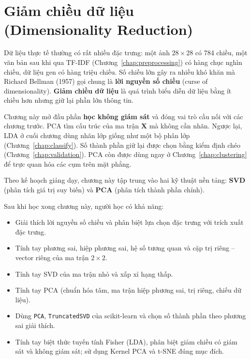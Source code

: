 
\chapter{Giảm chiều dữ liệu \\ (Dimensionality Reduction)}
\label{chap:reduce-dimension}

Dữ liệu thực tế thường có rất nhiều đặc trưng: một ảnh $28 \times 28$ có 784 chiều, một văn bản sau khi qua TF-IDF (Chương~\ref{chap:preprocessing}) có hàng chục nghìn chiều, dữ liệu gen có hàng triệu chiều. Số chiều lớn gây ra nhiều khó khăn mà Richard Bellman (1957) gọi chung là \textbf{lời nguyền số chiều} (curse of dimensionality). \textbf{Giảm chiều dữ liệu} là quá trình biểu diễn dữ liệu bằng ít chiều hơn nhưng giữ lại phần lớn thông tin.

Chương này mở đầu phần \textbf{học không giám sát} và đóng vai trò cầu nối với các chương trước. PCA tìm cấu trúc của ma trận $\mathbf{X}$ mà không cần nhãn. Ngược lại, LDA ở cuối chương dùng nhãn lớp giống như một bộ phân lớp (Chương~\ref{chap:classify}). Số thành phần giữ lại được chọn bằng kiểm định chéo (Chương~\ref{chap:validation}). PCA còn được dùng ngay ở Chương~\ref{chap:clustering} để trực quan hóa các cụm trên mặt phẳng.

Theo kế hoạch giảng dạy, chương này tập trung vào hai kỹ thuật nền tảng: \textbf{SVD} (phân tích giá trị suy biến) và \textbf{PCA} (phân tích thành phần chính).

\noindent Sau khi học xong chương này, người học có khả năng:
\begin{itemize}
    \item Giải thích lời nguyền số chiều và phân biệt lựa chọn đặc trưng với trích xuất đặc trưng.
    \item Tính tay phương sai, hiệp phương sai, hệ số tương quan và cặp trị riêng -- vector riêng của ma trận $2 \times 2$.
    \item Tính tay SVD của ma trận nhỏ và xấp xỉ hạng thấp.
    \item Tính tay PCA (chuẩn hóa tâm, ma trận hiệp phương sai, trị riêng, chiếu dữ liệu).
    \item Dùng \texttt{PCA}, \texttt{TruncatedSVD} của scikit-learn và chọn số thành phần theo phương sai giải thích.
    \item Tính tay biệt thức tuyến tính Fisher (LDA), phân biệt giảm chiều có giám sát và không giám sát; sử dụng Kernel PCA và t-SNE đúng mục đích.
\end{itemize}

